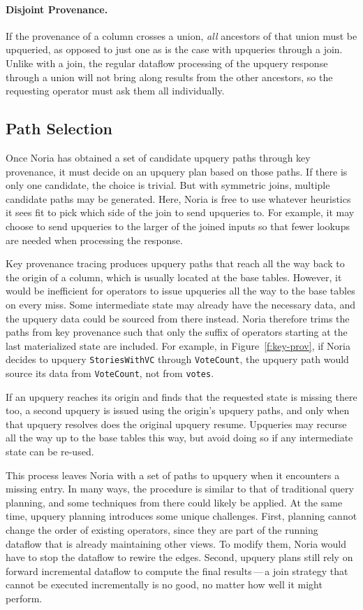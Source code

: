 \paragraph{Disjoint Provenance.}
If the provenance of a column crosses a union, \emph{all} ancestors of that
union must be upqueried, as opposed to just one as is the case with upqueries
through a join. Unlike with a join, the regular dataflow processing of the
upquery response through a union will not bring along results from the other
ancestors, so the requesting operator must ask them all individually.

\subsection{Path Selection}
\label{s:upquery:selection}

Once Noria has obtained a set of candidate upquery paths through key provenance,
it must decide on an upquery plan based on those paths. If there is only one
candidate, the choice is trivial. But with symmetric joins, multiple candidate
paths may be generated. Here, Noria is free to use whatever heuristics it sees
fit to pick which side of the join to send upqueries to. For example, it may
choose to send upqueries to the larger of the joined inputs so that fewer
lookups are needed when processing the response.

Key provenance tracing produces upquery paths that reach all the way back to the
origin of a column, which is usually located at the base tables. However, it
would be inefficient for operators to issue upqueries all the way to the base
tables on every miss. Some intermediate state may already have the necessary
data, and the upquery data could be sourced from there instead. Noria therefore
trims the paths from key provenance such that only the suffix of operators
starting at the last materialized state are included. For example, in
Figure~\ref{f:key-prov}, if Noria decides to upquery \texttt{StoriesWithVC}
through \texttt{VoteCount}, the upquery path would source its data from
\texttt{VoteCount}, not from \texttt{votes}.

If an upquery reaches its origin and finds that the requested state is missing
there too, a second upquery is issued using the origin's upquery paths, and only
when that upquery resolves does the original upquery resume. Upqueries may
recurse all the way up to the base tables this way, but avoid doing so if any
intermediate state can be re-used.

This process leaves Noria with a set of paths to upquery when it encounters a
missing entry. In many ways, the procedure is similar to that of traditional
query planning, and some techniques from there could likely be applied. At the
same time, upquery planning introduces some unique challenges. First, planning
cannot change the order of existing operators, since they are part of the
running dataflow that is already maintaining other views. To modify them, Noria
would have to stop the dataflow to rewire the edges. Second, upquery plans still
rely on forward incremental dataflow to compute the final results\,---\,a join
strategy that cannot be executed incrementally is no good, no matter how well it
might perform.

